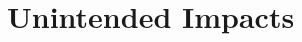 \documentclass[main]{subfiles}
\begin{document}
\section{Unintended Impacts}

\begin{frame}
    


\end{frame}



\end{document}

